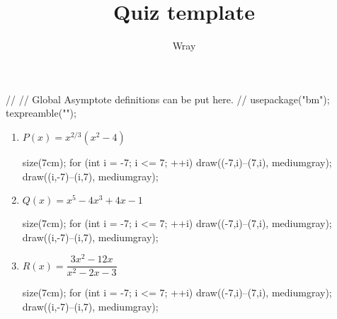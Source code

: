 \documentclass[addpoints, 12pt]{exam}
\title{Quiz template}
\author{Wray}
\begin{document}
\begin{asydef}
//
// Global Asymptote definitions can be put here.
//
usepackage("bm");
texpreamble("\def\V#1{\bm{#1}}");
\end{asydef}



\bigskip

             
\bigskip
\bigskip

\smallskip


\begin{enumerate}

	\item $P(x) = x^{2/3} \left( x^2 - 4 \right)$
	\begin{flushright}
	\begin{asy}
	size(7cm);
	for (int i = -7; i <= 7; ++i)
	{
    	draw((-7,i)--(7,i), mediumgray);
	    draw((i,-7)--(i,7), mediumgray);
    }
	\end{asy}
	\end{flushright}

    \item $Q(x) = x^5 - 4x^3 + 4x - 1$
    
	\begin{flushright}
	\begin{asy}
	size(7cm);
	for (int i = -7; i <= 7; ++i)
	{
    	draw((-7,i)--(7,i), mediumgray);
	    draw((i,-7)--(i,7), mediumgray);
    }
	\end{asy}
	\end{flushright}

\bigskip
\bigskip

\newpage

	\item $R(x) = \dfrac{3x^2 - 12x}{x^2 - 2x - 3}$
    
	\begin{flushright}
	\begin{asy}
	size(7cm);
	for (int i = -7; i <= 7; ++i)
	{
    	draw((-7,i)--(7,i), mediumgray);
	    draw((i,-7)--(i,7), mediumgray);
    }
	\end{asy}
	\end{flushright}

\end{enumerate}
\end{document}
